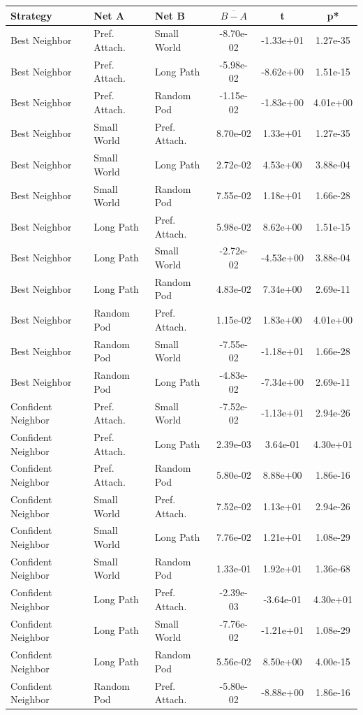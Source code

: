 \begin{table}[]
    \centering
    \begin{tabular}{l|ll|ccc}
        Strategy & Net A & Net B & $\overline{B - A}$ & t & p* \\
        \hline
Best Neighbor&Pref. Attach.&Small World&-8.70e-02&-1.33e+01&1.27e-35\\
Best Neighbor&Pref. Attach.&Long Path&-5.98e-02&-8.62e+00&1.51e-15\\
Best Neighbor&Pref. Attach.&Random Pod&-1.15e-02&-1.83e+00&4.01e+00\\
Best Neighbor&Small World&Pref. Attach.&8.70e-02&1.33e+01&1.27e-35\\
Best Neighbor&Small World&Long Path&2.72e-02&4.53e+00&3.88e-04\\
Best Neighbor&Small World&Random Pod&7.55e-02&1.18e+01&1.66e-28\\
Best Neighbor&Long Path&Pref. Attach.&5.98e-02&8.62e+00&1.51e-15\\
Best Neighbor&Long Path&Small World&-2.72e-02&-4.53e+00&3.88e-04\\
Best Neighbor&Long Path&Random Pod&4.83e-02&7.34e+00&2.69e-11\\
Best Neighbor&Random Pod&Pref. Attach.&1.15e-02&1.83e+00&4.01e+00\\
Best Neighbor&Random Pod&Small World&-7.55e-02&-1.18e+01&1.66e-28\\
Best Neighbor&Random Pod&Long Path&-4.83e-02&-7.34e+00&2.69e-11\\
\hline
Confident Neighbor&Pref. Attach.&Small World&-7.52e-02&-1.13e+01&2.94e-26\\
Confident Neighbor&Pref. Attach.&Long Path&2.39e-03&3.64e-01&4.30e+01\\
Confident Neighbor&Pref. Attach.&Random Pod&5.80e-02&8.88e+00&1.86e-16\\
Confident Neighbor&Small World&Pref. Attach.&7.52e-02&1.13e+01&2.94e-26\\
Confident Neighbor&Small World&Long Path&7.76e-02&1.21e+01&1.08e-29\\
Confident Neighbor&Small World&Random Pod&1.33e-01&1.92e+01&1.36e-68\\
Confident Neighbor&Long Path&Pref. Attach.&-2.39e-03&-3.64e-01&4.30e+01\\
Confident Neighbor&Long Path&Small World&-7.76e-02&-1.21e+01&1.08e-29\\
Confident Neighbor&Long Path&Random Pod&5.56e-02&8.50e+00&4.00e-15\\
Confident Neighbor&Random Pod&Pref. Attach.&-5.80e-02&-8.88e+00&1.86e-16\\

\end{tabular}
\end{table}
